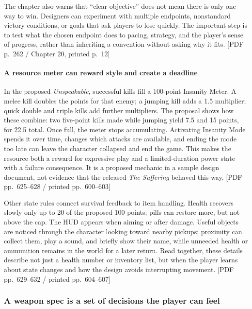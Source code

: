 The chapter also warns that ``clear objective'' does not mean there is only one way to win. Designers can experiment with multiple endpoints, nonstandard victory conditions, or goals that ask players to lose quickly. The important step is to test what the chosen endpoint does to pacing, strategy, and the player's sense of progress, rather than inheriting a convention without asking why it fits. {[}PDF p.~262 / Chapter 20, printed p.~12{]}

\paragraph{A resource meter can reward style and create a deadline}\label{05-engine-i-ch009-a-resource-meter-can-reward-style-and-create-a-deadline}

\hypertarget{05-engine-i-ch009-a-resource-meter-can-reward-style-and-create-a-deadline}{}

In the proposed \emph{Unspeakable}, successful kills fill a 100-point Insanity Meter. A melee kill doubles the points for that enemy; a jumping kill adds a 1.5 multiplier; quick double and triple kills add further multipliers. The proposal shows how these combine: two five-point kills made while jumping yield 7.5 and 15 points, for 22.5 total. Once full, the meter stops accumulating. Activating Insanity Mode spends it over time, changes which attacks are available, and ending the mode too late can leave the character collapsed and end the game. This makes the resource both a reward for expressive play and a limited-duration power state with a failure consequence. It is a proposed mechanic in a sample design document, not evidence that the released \emph{The Suffering} behaved this way. {[}PDF pp.~625--628 / printed pp.~600--603{]}

Other state rules connect survival feedback to item handling. Health recovers slowly only up to 20 of the proposed 100 points; pills can restore more, but not above the cap. The HUD appears when aiming or after damage. Useful objects are noticed through the character looking toward nearby pickups; proximity can collect them, play a sound, and briefly show their name, while unneeded health or ammunition remains in the world for a later return. Read together, these details describe not just a health number or inventory list, but when the player learns about state changes and how the design avoids interrupting movement. {[}PDF pp.~629--632 / printed pp.~604--607{]}

\subsubsection{A weapon spec is a set of decisions the player can feel}\label{05-engine-i-ch009-a-weapon-spec-is-a-set-of-decisions-the-player-can-feel}

